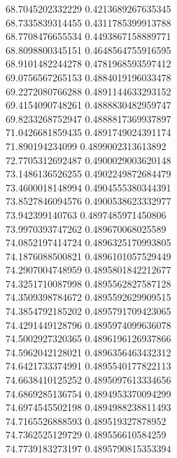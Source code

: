 {68.7045202332229 0.4213689267635345
 \\
68.7335839314455 0.4311785399913788
 \\
68.7708476655534 0.4493867158889771
 \\
68.8098800345151 0.4648564755916595
 \\
68.9101482244278 0.4781968593597412
 \\
69.0756567265153 0.4884019196033478
 \\
69.2272080766288 0.4891144633293152
 \\
69.4154090748261 0.4888830482959747
 \\
69.8233268752947 0.4888817369937897
 \\
71.0426681859435 0.4891749024391174
 \\
71.890194234099 0.4899002313613892
 \\
72.7705312692487 0.4900029003620148
 \\
73.1486136526255 0.4902249872684479
 \\
73.4600018148994 0.4904555380344391
 \\
73.8527846094576 0.4900538623332977
 \\
73.942399140763 0.4897485971450806
 \\
73.9970393747262 0.489670068025589
 \\
74.0852197414724 0.4896325170993805
 \\
74.1876088500821 0.4896101057529449
 \\
74.2907004748959 0.4895801842212677
 \\
74.3251710087998 0.4895562827587128
 \\
74.3509398784672 0.4895592629909515
 \\
74.3854792185202 0.4895791709423065
 \\
74.4291449128796 0.4895974099636078
 \\
74.5002927320365 0.4896196126937866
 \\
74.5962042128021 0.4896356463432312
 \\
74.6421733374991 0.4895540177822113
 \\
74.6638410125252 0.4895097613334656
 \\
74.6869285136754 0.4894953370094299
 \\
74.6974545502198 0.4894988238811493
 \\
74.7165526888593 0.489519327878952
 \\
74.7362525129729 0.489556610584259
 \\
74.7739183273197 0.4895790815353394
 \\
}
